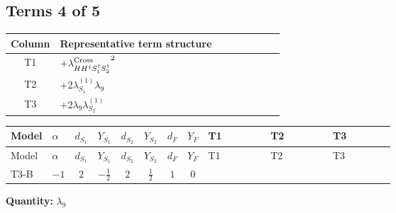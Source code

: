 \documentclass[8pt]{article}
\begin{document}
\begin{landscape}
\subsection*{Terms 4 of 5}
\begin{center}
\begin{tabular}{@{}c >{\raggedright\arraybackslash}p{0.82\linewidth}@{}}
\toprule
Column & Representative term structure \\
\midrule
T1 & \(\displaystyle +{\lambda_{H H^\dagger S_1^\dagger S_2^\dagger}^{\rm Cross}}^2\) \\
\midrule
T2 & \(\displaystyle +2 {\lambda_{S_1}^{(1)}} {\lambda_{9}}\) \\
\midrule
T3 & \(\displaystyle +2 {\lambda_{9}} {\lambda_{S_2}^{(1)}}\) \\
\midrule
\bottomrule
\end{tabular}
\end{center}
\smallskip
\tiny
\begin{longtable}{@{}llcccccc >{\raggedright\arraybackslash}p{0.21\linewidth} >{\raggedright\arraybackslash}p{0.21\linewidth} >{\raggedright\arraybackslash}p{0.21\linewidth}@{}}
\toprule
Model & $\alpha$ & $d_{S_1}$ & $Y_{S_1}$ & $d_{S_2}$ & $Y_{S_2}$ & $d_F$ & $Y_F$ & T1 & T2 & T3 \\
\midrule
\endfirsthead
\toprule
Model & $\alpha$ & $d_{S_1}$ & $Y_{S_1}$ & $d_{S_2}$ & $Y_{S_2}$ & $d_F$ & $Y_F$ & T1 & T2 & T3 \\
\midrule
\endhead
T3-B & $-1$ & $2$ & $-\frac{1}{2}$ & $2$ & $\frac{1}{2}$ & $1$ & $0$ & \scriptsize\adjustbox{max width=\linewidth}{$\begin{gathered} +{\lambda_{H H^\dagger S_1^\dagger S_2^\dagger}^{\rm Cross}}^2\end{gathered}$} & \scriptsize\adjustbox{max width=\linewidth}{$\begin{gathered} +2 {\lambda_{S_1}^{(1)}} {\lambda_{9}}\end{gathered}$} & \scriptsize\adjustbox{max width=\linewidth}{$\begin{gathered} +2 {\lambda_{9}} {\lambda_{S_2}^{(1)}}\end{gathered}$} \\
\midrule
\bottomrule
\end{longtable}
\clearpage
\noindent\textbf{Quantity: }$\lambda_{9}$\par\smallskip

\end{landscape}
\end{document}
